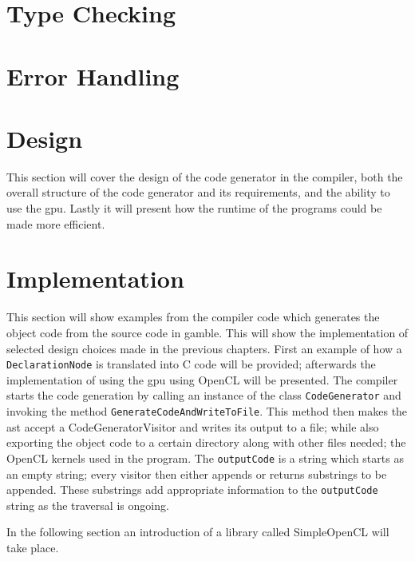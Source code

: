 \section{Type Checking}


\section{Error Handling}



\section{Design}
This section will cover the design of the code generator in the compiler, both the overall structure of the code generator and its requirements, and the ability to use the \acrshort{gpu}.
Lastly it will present how the runtime of the programs could be made more efficient.



\section{Implementation}
This section will show examples from the compiler code which generates the object code from the source code in \gls{gamble}.
This will show the implementation of selected design choices made in the previous chapters.
First an example of how a \texttt{DeclarationNode} is translated into C code will be provided; afterwards the implementation of using the \acrshort{gpu} using OpenCL will be presented.
The compiler starts the code generation by calling an instance of the class \texttt{CodeGenerator} and invoking the method \texttt{GenerateCodeAndWriteToFile}.
This method then makes the \acrshort{ast} accept a CodeGeneratorVisitor and writes its output to a file; while also exporting the object code to a certain directory along with other files needed; the OpenCL kernels used in the program.
The \texttt{outputCode} is a string which starts as an empty string; every visitor then either appends or returns substrings to be appended.
These substrings add appropriate information to the \texttt{outputCode} string as the traversal is ongoing.



In the following section an introduction of a library called SimpleOpenCL will take place.

